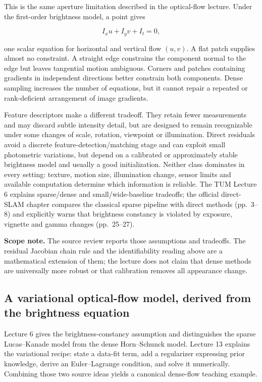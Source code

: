 This is the same aperture limitation described in the optical-flow lecture. Under the first-order brightness model, a point gives

\[
I_x u+I_y v+I_t=0,
\]

one scalar equation for horizontal and vertical flow \((u,v)\). A flat patch supplies almost no constraint. A straight edge constrains the component normal to the edge but leaves tangential motion ambiguous. Corners and patches containing gradients in independent directions better constrain both components. Dense sampling increases the number of equations, but it cannot repair a repeated or rank-deficient arrangement of image gradients.

Feature descriptors make a different tradeoff. They retain fewer measurements and may discard subtle intensity detail, but are designed to remain recognizable under some changes of scale, rotation, viewpoint or illumination. Direct residuals avoid a discrete feature-detection/matching stage and can exploit small photometric variations, but depend on a calibrated or approximately stable brightness model and usually a good initialization. Neither class dominates in every setting: texture, motion size, illumination change, sensor limits and available computation determine which information is reliable. The TUM Lecture 6 explains sparse/dense and small/wide-baseline tradeoffs; the official direct-SLAM chapter compares the classical sparse pipeline with direct methods (pp.~3--8) and explicitly warns that brightness constancy is violated by exposure, vignette and gamma changes (pp.~25--27).

\textbf{Scope note.} The source review reports those assumptions and tradeoffs. The residual Jacobian chain rule and the identifiability reading above are a mathematical extension of them; the lecture does not claim that dense methods are universally more robust or that calibration removes all appearance change.

\subsection{A variational optical-flow model, derived from the brightness equation}\label{02-foundations-ii-ch036-a-variational-optical-flow-model-derived-from-the-brightness-equation}

Lecture 6 gives the brightness-constancy assumption and distinguishes the sparse Lucas--Kanade model from the dense Horn--Schunck model. Lecture 13 explains the variational recipe: state a data-fit term, add a regularizer expressing prior knowledge, derive an Euler--Lagrange condition, and solve it numerically. Combining those two source ideas yields a canonical dense-flow teaching example.

